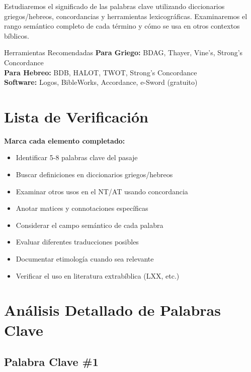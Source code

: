 \documentclass[11pt,a4paper]{article}
\begin{document}
Estudiaremos el significado de las palabras clave utilizando diccionarios griegos/hebreos, concordancias y herramientas lexicográficas. Examinaremos el rango semántico completo de cada término y cómo se usa en otros contextos bíblicos.

\begin{infobox}{Herramientas Recomendadas}
\textbf{Para Griego:} BDAG, Thayer, Vine's, Strong's Concordance\\
\textbf{Para Hebreo:} BDB, HALOT, TWOT, Strong's Concordance\\
\textbf{Software:} Logos, BibleWorks, Accordance, e-Sword (gratuito)
\end{infobox}

\section{Lista de Verificación}

\begin{checklistbox}
\textbf{Marca cada elemento completado:}

\begin{itemize}[leftmargin=1cm]
    \item[$\square$] Identificar 5-8 palabras clave del pasaje
    \item[$\square$] Buscar definiciones en diccionarios griegos/hebreos
    \item[$\square$] Examinar otros usos en el NT/AT usando concordancia
    \item[$\square$] Anotar matices y connotaciones específicas
    \item[$\square$] Considerar el campo semántico de cada palabra
    \item[$\square$] Evaluar diferentes traducciones posibles
    \item[$\square$] Documentar etimología cuando sea relevante
    \item[$\square$] Verificar el uso en literatura extrabíblica (LXX, etc.)
\end{itemize}
\end{checklistbox}

\newpage

\section{Análisis Detallado de Palabras Clave}

\subsection{Palabra Clave \#1}
\end{document}
